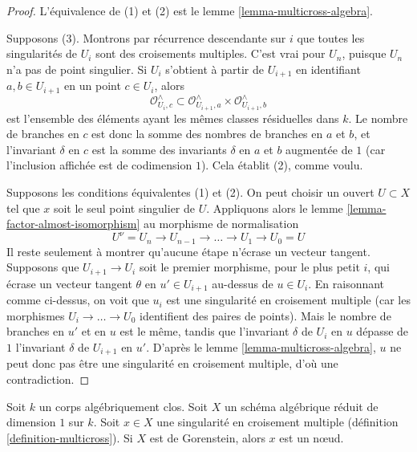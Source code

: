 \begin{proof}
L'équivalence de (1) et (2) est le lemme \ref{lemma-multicross-algebra}.

\medskip\noindent
Supposons (3). Montrons par récurrence descendante sur $i$ que toutes les singularités de $U_i$ sont des croisements multiples. C'est vrai pour $U_n$, puisque $U_n$ n'a pas de point singulier. Si $U_i$ s'obtient à partir de $U_{i + 1}$ en identifiant $a, b \in U_{i + 1}$ en un point $c \in U_i$, alors $$
\mathcal{O}_{U_i, c}^\wedge \subset
\mathcal{O}_{U_{i + 1}, a}^\wedge \times \mathcal{O}_{U_{i + 1}, b}^\wedge
$$ est l'ensemble des éléments ayant les mêmes classes résiduelles dans $k$. Le nombre de branches en $c$ est donc la somme des nombres de branches en $a$ et $b$, et l'invariant $\delta$ en $c$ est la somme des invariants $\delta$ en $a$ et $b$ augmentée de $1$ (car l'inclusion affichée est de codimension $1$). Cela établit (2), comme voulu.

\medskip\noindent
Supposons les conditions équivalentes (1) et (2). On peut choisir un ouvert $U \subset X$ tel que $x$ soit le seul point singulier de $U$. Appliquons alors le lemme \ref{lemma-factor-almost-isomorphism} au morphisme de normalisation $$
U^\nu = U_n \to U_{n - 1} \to \ldots \to U_1 \to U_0 = U
$$ Il reste seulement à montrer qu'aucune étape n'écrase un vecteur tangent. Supposons que $U_{i + 1} \to U_i$ soit le premier morphisme, pour le plus petit $i$, qui écrase un vecteur tangent $\theta$ en $u' \in U_{i + 1}$ au-dessus de $u \in U_i$. En raisonnant comme ci-dessus, on voit que $u_i$ est une singularité en croisement multiple (car les morphismes $U_i \to \ldots \to U_0$ identifient des paires de points). Mais le nombre de branches en $u'$ et en $u$ est le même, tandis que l'invariant $\delta$ de $U_i$ en $u$ dépasse de $1$ l'invariant $\delta$ de $U_{i + 1}$ en $u'$. D'après le lemme \ref{lemma-multicross-algebra}, $u$ ne peut donc pas être une singularité en croisement multiple, d'où une contradiction.
\end{proof}

\begin{lemma}
\label{lemma-multicross-gorenstein-is-nodal}
Soit $k$ un corps algébriquement clos. Soit $X$ un schéma algébrique réduit de dimension $1$ sur $k$. Soit $x \in X$ une singularité en croisement multiple (définition \ref{definition-multicross}). Si $X$ est de Gorenstein, alors $x$ est un nœud.
\end{lemma}

